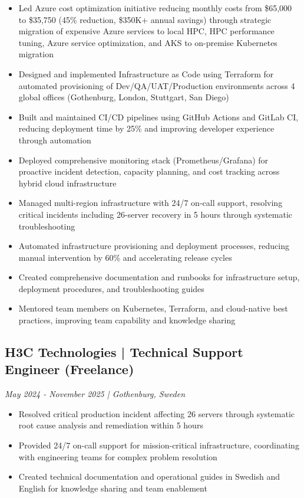 \documentclass[11pt,a4paper]{article}
\begin{document}
\begin{itemize}[leftmargin=*, itemsep=2pt]
\item Led Azure cost optimization initiative reducing monthly costs from \$65,000 to \$35,750 (45\% reduction, \$350K+ annual savings) through strategic migration of expensive Azure services to local HPC, HPC performance tuning, Azure service optimization, and AKS to on-premise Kubernetes migration
\item Designed and implemented Infrastructure as Code using Terraform for automated provisioning of Dev/QA/UAT/Production environments across 4 global offices (Gothenburg, London, Stuttgart, San Diego)
\item Built and maintained CI/CD pipelines using GitHub Actions and GitLab CI, reducing deployment time by 25\% and improving developer experience through automation
\item Deployed comprehensive monitoring stack (Prometheus/Grafana) for proactive incident detection, capacity planning, and cost tracking across hybrid cloud infrastructure
\item Managed multi-region infrastructure with 24/7 on-call support, resolving critical incidents including 26-server recovery in 5 hours through systematic troubleshooting
\item Automated infrastructure provisioning and deployment processes, reducing manual intervention by 60\% and accelerating release cycles
\item Created comprehensive documentation and runbooks for infrastructure setup, deployment procedures, and troubleshooting guides
\item Mentored team members on Kubernetes, Terraform, and cloud-native best practices, improving team capability and knowledge sharing
\end{itemize}

\subsection*{H3C Technologies | Technical Support Engineer (Freelance)}
\textit{May 2024 - November 2025 | Gothenburg, Sweden}

\begin{itemize}[leftmargin=*, itemsep=2pt]
\item Resolved critical production incident affecting 26 servers through systematic root cause analysis and remediation within 5 hours
\item Provided 24/7 on-call support for mission-critical infrastructure, coordinating with engineering teams for complex problem resolution
\item Created technical documentation and operational guides in Swedish and English for knowledge sharing and team enablement
\end{itemize}
\end{document}
